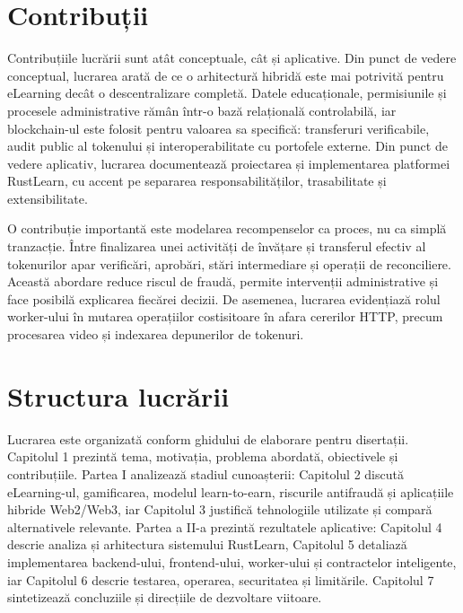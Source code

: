 \section{Contribuții}
Contribuțiile lucrării sunt atât conceptuale, cât și aplicative. Din punct de vedere conceptual, lucrarea arată de ce o arhitectură hibridă este mai potrivită pentru eLearning decât o descentralizare completă. Datele educaționale, permisiunile și procesele administrative rămân într-o bază relațională controlabilă, iar blockchain-ul este folosit pentru valoarea sa specifică: transferuri verificabile, audit public al tokenului și interoperabilitate cu portofele externe. Din punct de vedere aplicativ, lucrarea documentează proiectarea și implementarea platformei RustLearn, cu accent pe separarea responsabilităților, trasabilitate și extensibilitate.

O contribuție importantă este modelarea recompenselor ca proces, nu ca simplă tranzacție. Între finalizarea unei activități de învățare și transferul efectiv al tokenurilor apar verificări, aprobări, stări intermediare și operații de reconciliere. Această abordare reduce riscul de fraudă, permite intervenții administrative și face posibilă explicarea fiecărei decizii. De asemenea, lucrarea evidențiază rolul worker-ului în mutarea operațiilor costisitoare în afara cererilor HTTP, precum procesarea video și indexarea depunerilor de tokenuri.

\section{Structura lucrării}
Lucrarea este organizată conform ghidului de elaborare pentru disertații. Capitolul 1 prezintă tema, motivația, problema abordată, obiectivele și contribuțiile. Partea I analizează stadiul cunoașterii: Capitolul 2 discută eLearning-ul, gamificarea, modelul learn-to-earn, riscurile antifraudă și aplicațiile hibride Web2/Web3, iar Capitolul 3 justifică tehnologiile utilizate și compară alternativele relevante. Partea a II-a prezintă rezultatele aplicative: Capitolul 4 descrie analiza și arhitectura sistemului RustLearn, Capitolul 5 detaliază implementarea backend-ului, frontend-ului, worker-ului și contractelor inteligente, iar Capitolul 6 descrie testarea, operarea, securitatea și limitările. Capitolul 7 sintetizează concluziile și direcțiile de dezvoltare viitoare.
